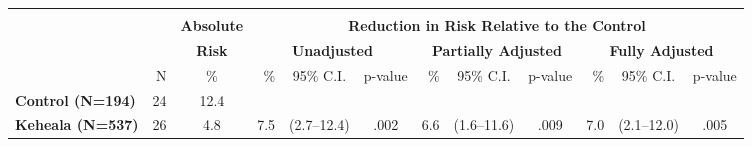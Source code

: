 \scriptsize{\def\sym#1{\ifmmode^{#1}\else\(^{#1}\)\fi}
\begin{tabular}{lrc|rcc|rcc|rcc}
\hline\hline \\[-8pt]
\rowcolor{yellow!15}				 	&	& \textbf{Absolute} 		& \multicolumn{9}{c}{\textbf{Reduction in Risk Relative to the Control}} \\
\rowcolor{yellow!15}					&	& \textbf{Risk}		& \multicolumn{3}{c}{\textbf{Unadjusted}} & \multicolumn{3}{c}{\textbf{Partially Adjusted}}	& \multicolumn{3}{c}{\textbf{Fully Adjusted}}  \\
\rowcolor{yellow!15}	  & N &  \% & \% & 95\% C.I. & p-value & \% & 95\% C.I. & p-value & \% & 95\% C.I. & p-value \\ \hline
\textbf{Control (N=194)} & 24  & 12.4  &    & & & & & &  \\
\textbf{Keheala (N=537)} & 26 &  4.8  & 7.5 & (2.7--12.4) & .002 & 6.6 & (1.6--11.6) & .009 & 7.0 & (2.1--12.0) & .005   \\
\hline \hline
\end{tabular}}